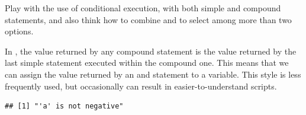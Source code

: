 \documentclass[krantz2]{krantz}\usepackage{knitr}
\begin{document}
\begin{playground}
Play with the use of conditional execution, with both simple and compound statements, and also think how to combine  and  to select among more than two options.
\end{playground}

In \Rlang, the value returned by any compound statement is the value returned by the last simple statement executed within the compound one. This means that we can assign the value returned by an  and  statement to a variable. This style is less frequently used, but occasionally can result in easier-to-understand scripts.

\begin{knitrout}\footnotesize
{}\color{fgcolor}\begin{kframe}
\begin{alltt}
 \hlkwb{<-} 
 \hlkwb{<-}
    \hlopt{<} \hlstd{)}   
\end{alltt}
\begin{verbatim}
## [1] "'a' is not negative"
\end{verbatim}
\end{kframe}
\end{knitrout}
\end{document}
